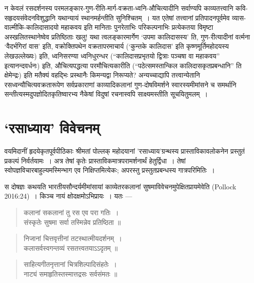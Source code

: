 {\dev न केवलं रसदर्शनस्य परमलङ्कार-गुण-रीति-मार्ग-वक्रता-ध्वनि-औचित्यादीनि सर्वाण्यपि काव्यतत्त्वानि कवि-सहृदयसंवेदनविशुद्धानि यथान्यायं स्थानमर्हन्तीति सुनिश्चितम्~। यत एतेषां तत्त्वानां प्रतिपादनपूर्वमेव व्यास-वाल्मीकि-कालिदासादयो महाकवय इति मानिताः पुनरेताभिः परिकल्पनाभिः प्रत्येकतया विमृष्टा अस्खलितस्थानेष्वेव प्रतिष्ठिताः खलु! यथा त्वलङ्कारमार्गेण `उपमा कालिदासस्य' ति, गुण-रीत्यादीनां वर्त्मना `वैदर्भगिरां वास' इति, वक्रोक्तिपथेन वक्रतापरमाचार्य (`कुन्तके कालिदास' इति कृष्णमूर्तिमहोदयस्य लेख\break उल्लेख्यः) इति, ध्वनिसरण्या ध्वनिधुरन्धर (``कालिदासप्रभृतयो द्वित्राः पञ्चषा वा महाकवय'' इत्यानन्द\-वर्धनः) इति, औचित्यपद्धत्या परमौचित्यकारीति (``पठेत्समस्तान्किल कालिदास\-कृत\-प्रब\-न्धानि'' ति क्षेमेन्द्रः) इति मतैक्यं वहद्भिः प्रस्थानैः किमन्यद्वा निरूप्यते? अन्यच्चाद्यापि तत्त्वान्येतानि रसध्वन्यौचित्यवक्रतारूपेण सर्वप्रकाराणां काव्यादिकलानां गुण-दोषविमर्शने स्वारस्यमीमांसने च समर्थानि सन्तीत्यस्मदुपज्ञोदितकृतिष्वारभ्य नैकेषां विदुषां रचनास्वपि साक्ष्यमस्तीति सूचयितुमलम्~।} 

\section*{{\dev `रसाध्याय' विवेचनम्}}

{\dev वयमिदानीं हृदयेकृतपूर्वपीठिकाः श्रीमतां पोल्लक् महोदयानां ’रसाध्याय’ग्रन्थस्य प्रास्तावि\-काव\-लोकनेन प्रस्तुतं प्रकल्पं निर्वर्तयामः~। अत्र तेषां कृतेः प्रास्ताविकमात्रपरामर्शनार्थं हेतुर्द्विधा~। तेषां स्वोपज्ञविचारबाहुल्यमस्मिन्भाग एव निक्षिप्तमित्येकः; अपरस्तु प्रस्तुतप्रबन्धस्य गात्र\-परिमितिः~।}

{\dev स दोषज्ञः कथयति भारतीयसौन्दर्यमीमांसायां काव्येतरकलानां सुषमाविवेचनमुपेक्षितप्राय\-मेवेति} (Pollock 2016:24){\dev~। किञ्च नायं क्षोदक्षमोऽभिप्रायः~। यतः ---}  
\begin{quote}
{\dev कलानां सकलानां तु रस एव परा गतिः~।}\\
{\dev संस्कृतेः सुषमा सर्वा तस्मिन्नेव प्रतिष्ठिता ॥}
\end{quote}
\begin{quote}
{\dev निजानां चित्तवृत्तीनां तटस्थात्मीयदर्शनम्~।}\\
{\dev कलासर्वस्वगन्तव्यं रसतत्त्वतयाऽऽदृतम् ॥}
\end{quote}
\begin{quote}
{\dev साहित्यगीतनृत्तानां चित्रशिल्पादिसंहतेः~।}\\
{\dev नाट्यं समाहृतिस्तस्मात्तद्रसः सर्वसंमतः ॥}
\end{quote}

